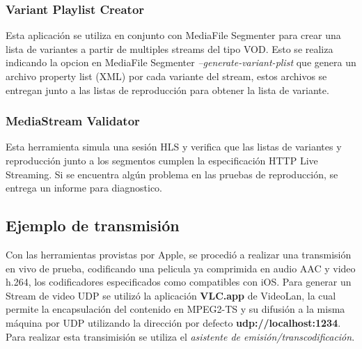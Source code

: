 		\subsubsection{Variant Playlist Creator}
		Esta aplicación se utiliza en conjunto con MediaFile Segmenter para crear una lista de variantes a partir de multiples streams del tipo VOD. Esto se realiza indicando la opcion en MediaFile Segmenter \textit{--generate-variant-plist} que genera un archivo property list (XML) por cada variante del stream, estos archivos se entregan junto a las listas de reproducción para obtener la lista de variante.
			
		\subsubsection{MediaStream Validator}		
		Esta herramienta simula una sesión HLS y verifica que las listas de variantes y reproducción junto a los segmentos cumplen la especificación HTTP Live Streaming. Si se encuentra algún problema en las pruebas de reproducción, se entrega un informe para diagnostico.
		
	\subsection{Ejemplo de transmisión}

Con las herramientas provistas por Apple, se procedió a realizar una transmisión en vivo de prueba, codificando una pelicula ya comprimida en audio AAC y video h.264, los codificadores especificados como compatibles con iOS. Para generar un Stream de video UDP se utilizó la aplicación \textbf{VLC.app} de VideoLan, la cual permite la encapsulación del contenido en MPEG2-TS y su difusión a la misma máquina por UDP utilizando la dirección por defecto \textbf{udp://localhost:1234}. Para realizar esta transimisión se utiliza el \textit{asistente de emisión/transcodificación}.\\

